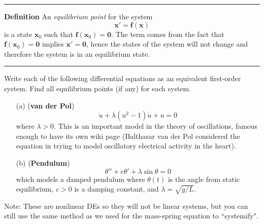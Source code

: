 \documentclass[11pt,letterpaper,boxed]{hmcpset}
\begin{document}
\begin{problem}[6.]
\bigskip
\hrule
\bigskip

\noindent \textbf{Definition} An \textit{equilibrium point} for the system 
\[ \mathbf{x}' = \mathbf{f}(\mathbf{x}) \] 
is a state $\mathbf{x}_0$ such that $\mathbf{f}(\mathbf{x}_0)=\mathbf{0}$. The term comes from the fact that $\mathbf{f}(\mathbf{x}_0)=\mathbf{0}$ implies 
$\mathbf{x}' = \mathbf{0}$, hence the states of the system will not change and therefore the system is in an equilibrium state.

\bigskip
\hrule
\bigskip


Write each of the following differential equations as an equivalent  first-order system. Find all equilibrium points (if any) for each system.
\begin{enumerate}
\item[(a)] (\textbf{van der Pol})
$$\ddot{u} + \lambda  (u^2 - 1) \dot{u} + u = 0$$ 
where $\lambda > 0$. This is an important model in the theory of oscillations, famous enough to have its own wiki page (Balthasar van der Pol considered the equation in trying to model oscillatory electrical activity in the heart).
 \item[(b)] (\textbf{Pendulum}) 
\[  \theta'' + c \theta' + \lambda \sin \theta = 0 \]
which models a damped pendulum where $\theta(t)$ is the angle from static equilibrium, $c > 0$ is a damping constant, and $\lambda = \sqrt{g/L}$.   
\end{enumerate}
Note: These are nonlinear DEs so they will not be linear systems, but you can still use the same method as we used for the mass-spring equation to ``systemify".
\end{problem}

\begin{solution}
\vfill
\end{solution}
\newpage
\end{document}
